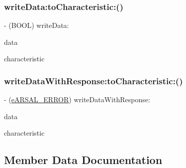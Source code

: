 \hypertarget{interfaceARSAL__BLEManager_ae708dcfc73ba14001397bd7a9fabdef5}{}\label{interfaceARSAL__BLEManager_ae708dcfc73ba14001397bd7a9fabdef5} 
\subsubsection{\texorpdfstring{write\+Data\+:to\+Characteristic\+:()}{writeData:toCharacteristic:()}}
{\footnotesize\ttfamily -\/ (B\+O\+OL) write\+Data\+: \begin{DoxyParamCaption}\item[{(N\+S\+Data $\ast$)}]{data }\item[{toCharacteristic:(C\+B\+Characteristic $\ast$)}]{characteristic }\end{DoxyParamCaption}}

\hypertarget{interfaceARSAL__BLEManager_a9215414f0744c885157a4f705469e482}{}\label{interfaceARSAL__BLEManager_a9215414f0744c885157a4f705469e482} 
\subsubsection{\texorpdfstring{write\+Data\+With\+Response\+:to\+Characteristic\+:()}{writeDataWithResponse:toCharacteristic:()}}
{\footnotesize\ttfamily -\/ (\hyperlink{ARSAL__Error_8h_a95978608019620b9d7e573ad874e5889}{e\+A\+R\+S\+A\+L\+\_\+\+E\+R\+R\+OR}) write\+Data\+With\+Response\+: \begin{DoxyParamCaption}\item[{(N\+S\+Data $\ast$)}]{data }\item[{toCharacteristic:(C\+B\+Characteristic $\ast$)}]{characteristic }\end{DoxyParamCaption}}



\subsection{Member Data Documentation}
\hypertarget{interfaceARSAL__BLEManager_ae3c5e30776574be97aa83842636f33f4}{}\label{interfaceARSAL__BLEManager_ae3c5e30776574be97aa83842636f33f4} 
